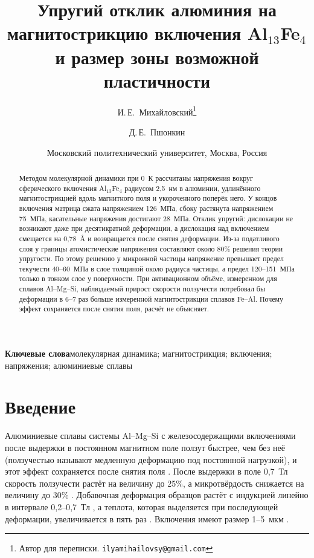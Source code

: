\documentclass[11pt,a4paper]{article}
\title{Упругий отклик алюминия на магнитострикцию включения Al$_{13}$Fe$_4$
и размер зоны возможной пластичности}
\author{И.\,Е.~Михайловский\thanks{Автор для переписки.
\texttt{ilyamihailovsy@gmail.com}} \and Д.\,Е.~Пшонкин}
\date{Московский политехнический университет, Москва, Россия}
\begin{document}
\maketitle

\begin{abstract}
Методом молекулярной динамики при 0~К рассчитаны напряжения вокруг
сферического включения Al$_{13}$Fe$_4$ радиусом 2{,}5~нм в алюминии,
удлинённого магнитострикцией вдоль магнитного поля и укороченного поперёк
него. У концов включения матрица сжата напряжением 126~МПа, сбоку
растянута напряжением 75~МПа, касательные напряжения достигают
28~МПа. Отклик упругий: дислокации не возникают даже при
десятикратной деформации, а дислокация над включением смещается на
0{,}78~\AA{} и возвращается после снятия деформации. Из-за
податливого слоя у границы атомистические напряжения составляют около
80\% решения теории упругости. По этому решению у микронной частицы
напряжение превышает предел текучести 40--60~МПа в слое толщиной около
радиуса частицы, а предел 120--151~МПа только в тонком слое
у поверхности. При активационном объёме, измеренном для сплавов
Al--Mg--Si, наблюдаемый прирост скорости ползучести потребовал бы
деформации в 6--7 раз больше измеренной магнитострикции сплавов Fe--Al.
Почему эффект сохраняется после снятия поля, расчёт не объясняет.
\end{abstract}

\noindent\textbf{Ключевые слова}\quad молекулярная динамика;
магнитострикция; включения; напряжения; алюминиевые сплавы

\section{Введение}

Алюминиевые сплавы системы Al--Mg--Si с железосодержащими включениями
после выдержки в постоянном магнитном поле ползут быстрее, чем без неё
(ползучестью называют медленную деформацию под постоянной нагрузкой),
и этот эффект сохраняется после снятия поля
\cite{Skvortsov2019JAP,Skvortsov2019PSS,Friha2024JMMM,Nikolaev2025SciRep}.
После выдержки в поле 0{,}7~Тл скорость ползучести растёт на величину
до 25\%, а микротвёрдость снижается на величину до 30\% \cite{Skvortsov2019JAP}.
Добавочная деформация образцов растёт с индукцией линейно в интервале
0{,}2--0{,}7~Тл \cite{Friha2024JMMM}, а теплота, которая выделяется при
последующей деформации, увеличивается в пять раз \cite{Pshonkin2025ZL}.
Включения имеют размер 1--5~мкм \cite{Skvortsov2019JAP,Pshonkin2025ZL}.
\end{document}
